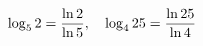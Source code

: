 \documentclass[preview]{standalone}
\begin{document}
\begin{align*}
\special{dvisvgm:raw <g id='unique000'>}\log_5 2 = \frac{\ln 2}{\ln 5},\quad \log_4 25 = \frac{\ln 25}{\ln 4}\special{dvisvgm:raw </g>}
\end{align*}
\end{document}
